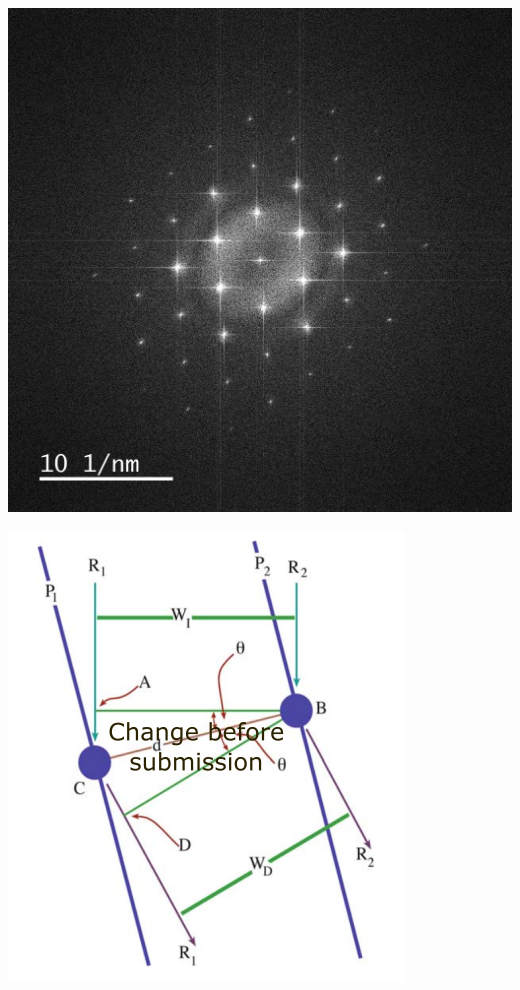 \begin{minipage}[t]{0.5\textwidth}
    \centering
    \includegraphics[width=0.95\linewidth, keepaspectratio]{resources/Figures/fft_of_ml.png}
    \label{fig:diffraction_pattern}
\end{minipage}%
\begin{minipage}[t]{0.5\textwidth}
    \centering
    \includegraphics[width=0.95\linewidth, keepaspectratio]{resources/Figures/scattering.png}
    \label{fig:scatt_angle}
\end{minipage}


